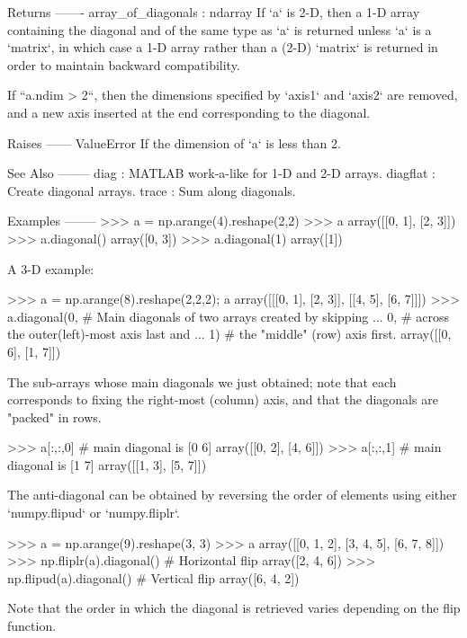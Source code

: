 \begin{DoxyVerb}
Returns
-------
array_of_diagonals : ndarray
    If `a` is 2-D, then a 1-D array containing the diagonal and of the
    same type as `a` is returned unless `a` is a `matrix`, in which case
    a 1-D array rather than a (2-D) `matrix` is returned in order to
    maintain backward compatibility.

    If ``a.ndim > 2``, then the dimensions specified by `axis1` and `axis2`
    are removed, and a new axis inserted at the end corresponding to the
    diagonal.

Raises
------
ValueError
    If the dimension of `a` is less than 2.

See Also
--------
diag : MATLAB work-a-like for 1-D and 2-D arrays.
diagflat : Create diagonal arrays.
trace : Sum along diagonals.

Examples
--------
>>> a = np.arange(4).reshape(2,2)
>>> a
array([[0, 1],
       [2, 3]])
>>> a.diagonal()
array([0, 3])
>>> a.diagonal(1)
array([1])

A 3-D example:

>>> a = np.arange(8).reshape(2,2,2); a
array([[[0, 1],
        [2, 3]],
       [[4, 5],
        [6, 7]]])
>>> a.diagonal(0,  # Main diagonals of two arrays created by skipping
...            0,  # across the outer(left)-most axis last and
...            1)  # the "middle" (row) axis first.
array([[0, 6],
       [1, 7]])

The sub-arrays whose main diagonals we just obtained; note that each
corresponds to fixing the right-most (column) axis, and that the
diagonals are "packed" in rows.

>>> a[:,:,0]  # main diagonal is [0 6]
array([[0, 2],
       [4, 6]])
>>> a[:,:,1]  # main diagonal is [1 7]
array([[1, 3],
       [5, 7]])

The anti-diagonal can be obtained by reversing the order of elements
using either `numpy.flipud` or `numpy.fliplr`.

>>> a = np.arange(9).reshape(3, 3)
>>> a
array([[0, 1, 2],
       [3, 4, 5],
       [6, 7, 8]])
>>> np.fliplr(a).diagonal()  # Horizontal flip
array([2, 4, 6])
>>> np.flipud(a).diagonal()  # Vertical flip
array([6, 4, 2])

Note that the order in which the diagonal is retrieved varies depending
on the flip function.
\end{DoxyVerb}
 \mbox{\label{namespacenumpy_1_1core_1_1fromnumeric_a520c4e347a902bc39c2d7bddb016405e}} 
